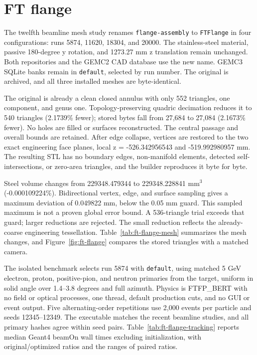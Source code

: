 \FloatBarrier
\section{FT flange}
\label{sec:ft-flange}

The twelfth beamline mesh study renames \texttt{flange-assembly} to \texttt{FTFlange} in four configurations:
runs 5874, 11620, 18304, and 20000. The stainless-steel material, passive 180-degree y rotation, and 1273.27
mm z translation remain unchanged. Both repositories and the GEMC2 CAD database use the new name. GEMC3 SQLite
banks remain in \texttt{default}, selected by run number. The original is archived, and all three installed
meshes are byte-identical.

The original is already a clean closed annulus with only 552 triangles, one component, and genus one.
Topology-preserving quadric decimation reduces it to 540 triangles (2.1739\% fewer); stored bytes fall from
27,684 to 27,084 (2.1673\% fewer). No holes are filled or surfaces reconstructed. The central passage and
overall bounds are retained. After edge collapse, vertices are restored to the two exact engineering face
planes, local z = -526.342956543 and -519.992980957 mm. The resulting STL has no boundary edges, non-manifold
elements, detected self-intersections, or zero-area triangles, and the builder reproduces it byte for byte.

Steel volume changes from 229348.479344 to 229348.228841 mm$^3$ (-0.000109224\%). Bidirectional vertex, edge,
and surface sampling gives a maximum deviation of 0.049822 mm, below the 0.05 mm guard. This sampled maximum
is not a proven global error bound. A 536-triangle trial exceeds that guard; larger reductions are rejected.
The small reduction reflects the already-coarse engineering tessellation. Table~\ref{tab:ft-flange-mesh}
summarizes the mesh changes, and Figure~\ref{fig:ft-flange} compares the stored triangles with a matched
camera.

The isolated benchmark selects run 5874 with \texttt{default}, using matched 5 GeV electron, proton,
positive-pion, and neutron primaries from the target, uniform in solid angle over 1.4--3.8 degrees and full
azimuth. Physics is FTFP\_BERT with no field or optical processes, one thread, default production cuts, and no
GUI or event output. Five alternating-order repetitions use 2,000 events per particle and seeds 12345--12349.
The executable matches the recent beamline studies, and all primary hashes agree within seed pairs.
Table~\ref{tab:ft-flange-tracking} reports median Geant4 beamOn wall times excluding initialization, with
original/optimized ratios and the ranges of paired ratios.

